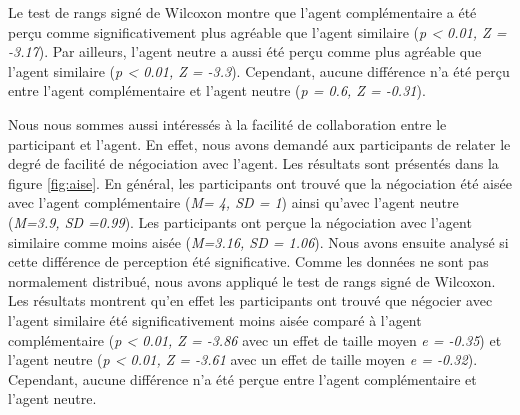 	
	Le test de rangs signé de Wilcoxon montre que l'agent complémentaire a été perçu comme significativement plus agréable que l'agent similaire (\emph{p < 0.01, Z = -3.17}). Par ailleurs, l'agent neutre a aussi été perçu comme plus agréable que l'agent similaire (\emph{p < 0.01, Z = -3.3}). Cependant, aucune différence n'a été perçu entre l'agent complémentaire et l'agent neutre (\emph{p = 0.6, Z = -0.31}).
	
	Nous nous sommes aussi intéressés à la facilité de collaboration entre le participant et l'agent. En effet, nous avons demandé aux participants de relater le degré de facilité de négociation avec l'agent. Les résultats sont présentés dans la figure \ref{fig:aise}. En général, les participants ont trouvé que la négociation été aisée avec l'agent complémentaire (\emph{M= 4, SD = 1}) ainsi qu'avec l'agent neutre (\emph{M=3.9, SD =0.99}). Les participants ont perçue la négociation avec l'agent similaire comme moins aisée (\emph{M=3.16, SD = 1.06}). 
	Nous avons ensuite analysé si cette différence de perception été significative. Comme les données ne sont pas normalement distribué, nous avons appliqué le test de rangs signé de Wilcoxon. Les résultats montrent qu'en effet les participants ont trouvé que négocier avec l'agent similaire été significativement moins aisée comparé à l'agent complémentaire (\emph{p < 0.01, Z = -3.86} avec un effet de taille moyen \emph{e = -0.35}) et l'agent neutre (\emph{p < 0.01, Z = -3.61} avec un effet de taille moyen \emph{e = -0.32}).
	Cependant, aucune différence n'a été perçue entre l'agent complémentaire et l'agent neutre.

